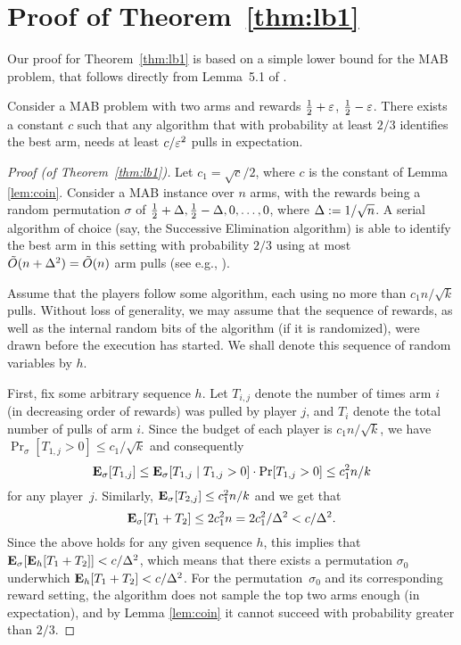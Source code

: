 \documentclass{article} %
\begin{document}
\section{Proof of Theorem~\ref{thm:lb1}}

Our proof for Theorem~\ref{thm:lb1} is based on a simple lower bound for the MAB problem, that follows directly from Lemma~5.1 of \cite{anthony1999neural}. 

\begin{lemma} \label{lem:coin}
Consider a MAB problem with two arms and rewards $\frac{1}{2} + \varepsilon$, $\frac{1}{2} - \varepsilon$.
There exists a constant $c$ such that any algorithm that with probability at least $2/3$ identifies the best arm, needs at least $c /\varepsilon^2$ pulls in expectation.
\end{lemma}



\begin{proof}[Proof (of Theorem~\ref{thm:lb1})]
Let $c_1 = \sqrt{c}/2$, where $c$ is the constant of Lemma \ref{lem:coin}.
Consider a MAB instance over $n$ arms, with the rewards being a random
permutation $\sigma$ of $\frac{1}{2} + \Delta, \frac{1}{2} - \Delta, 0, \ldots, 0$, where $\Delta := 1/\sqrt{n}$.
A serial algorithm of choice (say, the Successive Elimination algorithm) is able to identify the best arm in this setting with probability $2/3$ using at most $\tilde{O}(n + \Delta^2) = \tilde{O}(n)$ arm pulls (see e.g., \cite{evendar06}).

Assume that the players follow some algorithm, each using no more than $c_1 n/\sqrt{k}$ pulls. Without loss of generality, we may assume that the sequence of rewards, as well as the internal random bits of the algorithm (if it is randomized), were drawn before the execution has started. We shall denote this sequence of random variables by $h$.

First, fix some arbitrary sequence $h$. Let $T_{i,j}$ denote the number of times arm $i$ (in decreasing order of rewards) was pulled by player $j$, and $T_i$ denote the total number of pulls of arm $i$.
Since the budget of each player is $c_1 n/\sqrt{k}$, we have $\Pr_\sigma[T_{1,j} > 0] \le c_1 / \sqrt{k}$ and consequently
\[
	\mathbf{E}_\sigma[T_{1,j}]
	\le \mathbf{E}_\sigma[T_{1,j} \mid T_{1,j} > 0] \cdot \Pr[T_{1,j} > 0]
	\le c_1^2 n/k
\]
for any player~$j$.
Similarly, $\mathbf{E}_\sigma[T_{2,j}] \le c_1^2 n/k$ and we get that 
\[
	\mathbf{E}_\sigma[T_1 + T_2] \le 2 c_1^2 n = 2 c_1^2 / \Delta^2 < c / \Delta^2 .
\]
Since the above holds for any given sequence $h$, this implies that $\mathbf{E}_\sigma[\mathbf{E}_h[T_1 + T_2]] < c / \Delta^2$, which means that there exists a permutation $\sigma_0$ underwhich $\mathbf{E}_h[T_1 + T_2] < c / \Delta^2$.
For the permutation~$\sigma_0$ and its corresponding reward setting, the algorithm does not sample the top two arms enough (in expectation), and by Lemma \ref{lem:coin} it cannot succeed with probability greater than $2/3$.
\end{proof}
\end{document}
